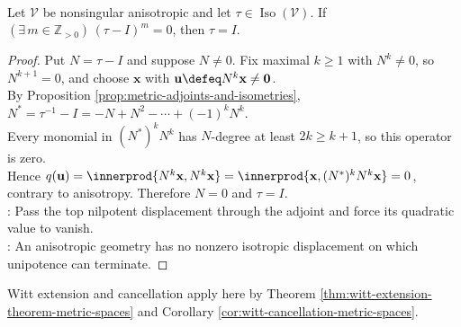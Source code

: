 \begin{proposition} \label{prop:anisotropic-space-has-no-nontrivial-unipotent-isometries} \\
Let $\mathcal{V}$ be nonsingular anisotropic and let $\tau\in\operatorname{Iso}(\mathcal{V})$. If $(\exists\,m\in\mathbb{Z}_{>0})\,(\tau-I)^m=0$, then $\tau=I$.
\begin{proof}
Put $N=\tau-I$ and suppose $N\neq0$. Fix maximal $k\geq1$ with $N^k\neq0$, so $N^{k+1}=0$, and choose $\mathbf{x}$ with $\mathbf{u}\defeq N^k\mathbf{x}\neq\mathbf{0}$.\\
By Proposition \ref{prop:metric-adjoints-and-isometries}, $N^*=\tau^{-1}-I=-N+N^2-\cdots+(-1)^kN^k$.\\
Every monomial in $(N^*)^kN^k$ has $N$-degree at least $2k\geq k+1$, so this operator is zero.\\
Hence $q(\mathbf{u})=\innerprod{N^k\mathbf{x},N^k\mathbf{x}}=\innerprod{\mathbf{x},(N^*)^kN^k\mathbf{x}}=0$, contrary to anisotropy. Therefore $N=0$ and $\tau=I$.\\
: Pass the top nilpotent displacement through the adjoint and force its quadratic value to vanish.\\
: An anisotropic geometry has no nonzero isotropic displacement on which unipotence can terminate.
\end{proof}
\end{proposition}

Witt extension and cancellation apply here by Theorem \ref{thm:witt-extension-theorem-metric-spaces} and Corollary \ref{cor:witt-cancellation-metric-spaces}.
